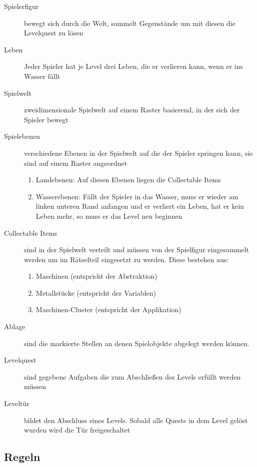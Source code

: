 \documentclass{scrartcl}
\begin{document}
\begin{description}
	\item[Spielerfigur] bewegt sich durch die Welt, sammelt Gegenstände um mit diesen die Levelquest zu lösen
	\item[Leben] Jeder Spieler hat je Level drei Leben, die er verlieren kann, wenn er ins Wasser fällt
	\item[Spielwelt] zweidimensionale Spielwelt auf einem Raster basierend, in der sich der Spieler bewegt
	\item[Spielebenen] verschiedene Ebenen in der Spielwelt auf die der Spieler springen kann, sie sind auf einem Raster angeordnet
		\begin{enumerate}[label=\arabic*]
			\item Landebenen: Auf diesen Ebenen liegen die Collectable Items
			\item Wasserebenen: Fällt der Spieler in das Wasser, muss er wieder am linken unteren Rand anfangen und er verliert ein Leben, hat er kein Leben mehr, so muss er das Level neu beginnen
		\end{enumerate}
	\item[Collectable Items] \label{elemente:collectable}sind in der Spielwelt verteilt und müssen von der Spielfigur eingesammelt werden um im Rätselteil eingesetzt zu werden. Diese bestehen aus:
	\begin{enumerate}[label=\arabic*]
		\item Maschinen (entspricht der Abstraktion)
		\item Metallstücke (entspricht der Variablen)
		\item Maschinen-Cluster (entspricht der Applikation)
	\end{enumerate}
	\item[Ablage] sind die markierte Stellen an denen Spielobjekte abgelegt werden können.
	\item[Levelquest] sind gegebene Aufgaben die zum Abschließen des Levels erfüllt werden müssen
	\item[Leveltür] bildet den Abschluss eines Levels. Sobald alle Quests in dem Level gelöst wurden wird die Tür freigeschaltet
\end{description}

\subsection{Regeln}
\end{document}
